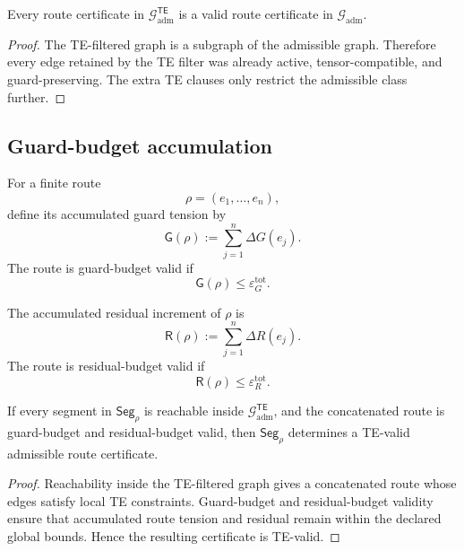 \begin{lemma}
\label{lem:v410r16-te-filtering-preserves-validity}
Every route certificate in \(\mathcal G_{\mathrm{adm}}^{\mathsf{TE}}\) is a
valid route certificate in \(\mathcal G_{\mathrm{adm}}\).
\end{lemma}

\begin{proof}
The TE-filtered graph is a subgraph of the admissible graph. Therefore every
edge retained by the TE filter was already active, tensor-compatible, and
guard-preserving. The extra TE clauses only restrict the admissible class
further.
\end{proof}

\subsection{Guard-budget accumulation}
\label{subsec:v410r16-guard-budget-accumulation}

\begin{definition}
\label{def:v410r16-route-guard-budget}
For a finite route
\[
 \rho=(e_1,\ldots,e_n),
\]
define its accumulated guard tension by
\[
 \mathsf G(\rho)
 :=
 \sum_{j=1}^n \Delta G(e_j).
\]
The route is guard-budget valid if
\[
 \mathsf G(\rho)\leq \varepsilon_G^{\mathrm{tot}}.
\]
\end{definition}

\begin{definition}
\label{def:v410r16-route-residual-budget}
The accumulated residual increment of \(\rho\) is
\[
 \mathsf R(\rho)
 :=
 \sum_{j=1}^n \Delta R(e_j).
\]
The route is residual-budget valid if
\[
 \mathsf R(\rho)\leq \varepsilon_R^{\mathrm{tot}}.
\]
\end{definition}

\begin{proposition}
\label{prop:v410r16-budget-valid-segment-certificate}
If every segment in \(\mathsf{Seg}_{\rho}\) is reachable inside
\(\mathcal G_{\mathrm{adm}}^{\mathsf{TE}}\), and the concatenated route is
guard-budget and residual-budget valid, then \(\mathsf{Seg}_{\rho}\) determines
a TE-valid admissible route certificate.
\end{proposition}

\begin{proof}
Reachability inside the TE-filtered graph gives a concatenated route whose
edges satisfy local TE constraints. Guard-budget and residual-budget validity
ensure that accumulated route tension and residual remain within the declared
global bounds. Hence the resulting certificate is TE-valid.
\end{proof}

